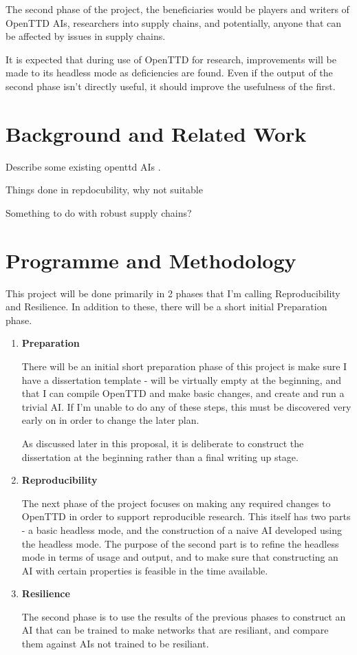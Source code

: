 \documentclass[a4paper,11pt]{article}
\begin{document}
The second phase of the project, the beneficiaries would be players and writers of OpenTTD AIs, researchers into supply chains, and potentially, anyone that can be affected by issues in supply chains.

It is expected that during use of OpenTTD for research, improvements will be made to its headless mode as deficiencies are found. Even if the output of the second phase isn't directly useful, it should improve the usefulness of the first.

\section{Background and Related Work}

Describe some existing openttd AIs \cite{openttd}.

Things done in repdocubility, why not suitable

Something to do with robust supply chains?

\section{Programme and Methodology}

This project will be done primarily in 2 phases that I'm calling Reproducibility and Resilience. In addition to these, there will be a short initial Preparation phase.

\begin{enumerate}
\addtocounter{enumi}{-1}
    \item \textbf{Preparation}

    There will be an initial short preparation phase of this project is make sure I have a dissertation template - will be virtually empty at the beginning, and that I can compile OpenTTD and make basic changes, and create and run a trivial AI. If I'm unable to do any of these steps, this must be discovered very early on in order to change the later plan.

    As discussed later in this proposal, it is deliberate to construct the dissertation at the beginning rather than a final writing up stage.
    
    \item \textbf{Reproducibility}

    The next phase of the project focuses on making any required changes to OpenTTD in order to support reproducible research. This itself has two parts - a basic headless mode, and the construction of a naive AI developed using the headless mode. The purpose of the second part is to refine the headless mode in terms of usage and output, and to make sure that constructing an AI with certain properties is feasible in the time available.
    
    \item \textbf{Resilience}

    The second phase is to use the results of the previous phases to construct an AI that can be trained to make networks that are resiliant, and compare them against AIs not trained to be resiliant.
    
\end{enumerate}
\end{document}

